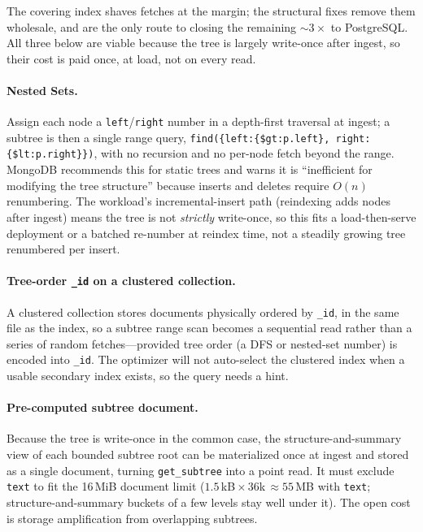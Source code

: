 \documentclass[11pt]{article}
\newcommand{\code}[1]{\texttt{#1}}
\begin{document}
The covering index shaves fetches at the margin; the structural fixes remove them
wholesale, and are the only route to closing the remaining ${\sim}3\times$ to
PostgreSQL. All three below are viable because the tree is largely write-once
after ingest, so their cost is paid once, at load, not on every read.

\paragraph{Nested Sets.} Assign each node a \code{left}/\code{right} number in a
depth-first traversal at ingest; a subtree is then a single range query,
\code{find(\{left:\{\$gt:p.left\}, right:\{\$lt:p.right\}\})}, with no recursion
and no per-node fetch beyond the range. MongoDB recommends this for static trees
and warns it is ``inefficient for modifying the tree structure'' because inserts
and deletes require $O(n)$ renumbering. The workload's incremental-insert path
(reindexing adds nodes after ingest) means the tree is not \emph{strictly}
write-once, so this fits a load-then-serve deployment or a batched re-number at
reindex time, not a steadily growing tree renumbered per insert.

\paragraph{Tree-order \code{\_id} on a clustered collection.} A clustered
collection stores documents physically ordered by \code{\_id}, in the same file as
the index, so a subtree range scan becomes a sequential read rather than a series
of random fetches---provided tree order (a DFS or nested-set number) is encoded
into \code{\_id}. The optimizer will not auto-select the clustered index when a
usable secondary index exists, so the query needs a hint.

\paragraph{Pre-computed subtree document.} Because the tree is write-once in the
common case, the structure-and-summary view of each bounded subtree root can be
materialized once at ingest and stored as a single document, turning
\code{get\_subtree} into a point read. It must exclude \code{text} to fit the
16\,MiB document limit ($1.5$\,kB\,${\times}$\,36k\,${\approx}55$\,MB with
\code{text}; structure-and-summary buckets of a few levels stay well under it).
The open cost is storage amplification from overlapping subtrees.
\end{document}
